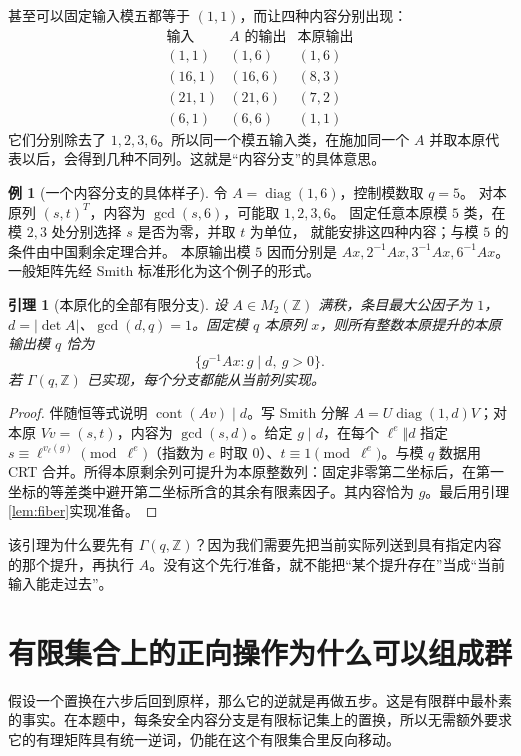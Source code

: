 \documentclass[11pt,a4paper,oneside,openany]{book}
\newcommand{\Z}{\mathbb Z}
\newcommand{\diag}{\operatorname{diag}}
\newcommand{\cont}{\operatorname{cont}}
\newtheorem{lemma}[theorem]{引理}
\theoremstyle{definition}
\newtheorem{example}[theorem]{例}
\numberwithin{equation}{chapter}
\begin{document}
甚至可以固定输入模五都等于 $(1,1)$，而让四种内容分别出现：
\[
\begin{array}{c|c|c}
\text{输入}&A\text{ 的输出}&\text{本原输出}\\ \hline
(1,1)&(1,6)&(1,6)\\
(16,1)&(16,6)&(8,3)\\
(21,1)&(21,6)&(7,2)\\
(6,1)&(6,6)&(1,1)
\end{array}
\]
它们分别除去了 $1,2,3,6$。所以同一个模五输入类，在施加同一个 $A$ 并取本原代表以后，会得到几种不同列。这就是“内容分支”的具体意思。
\begin{example}[一个内容分支的具体样子]
令 $A=\diag(1,6)$，控制模数取 $q=5$。
对本原列 $(s,t)^T$，内容为 $\gcd(s,6)$，可能取 $1,2,3,6$。
固定任意本原模 $5$ 类，在模 $2,3$ 处分别选择 $s$ 是否为零，并取 $t$ 为单位，
就能安排这四种内容；与模 $5$ 的条件由中国剩余定理合并。
本原输出模 $5$ 因而分别是 $Ax,2^{-1}Ax,3^{-1}Ax,6^{-1}Ax$。
一般矩阵先经 Smith 标准形化为这个例子的形式。
\end{example}
\begin{lemma}[本原化的全部有限分支]\label{lem:content}
设 $A\in M_2(\Z)$ 满秩，条目最大公因子为 $1$，$d=|\det A|$、$\gcd(d,q)=1$。固定模 $q$ 本原列 $x$，则所有整数本原提升的本原输出模 $q$ 恰为
\begin{equation}\label{eq:content}
\{g^{-1}Ax:g\mid d,\ g>0\}.
\end{equation}
若 $\Gamma(q,\Z)$ 已实现，每个分支都能从当前列实现。
\end{lemma}
\begin{proof}
伴随恒等式说明 $\cont(Av)\mid d$。写 Smith 分解 $A=U\diag(1,d)V$；对本原 $Vv=(s,t)$，内容为 $\gcd(s,d)$。给定 $g\mid d$，在每个 $\ell^e\Vert d$ 指定 $s\equiv\ell^{v_\ell(g)}\pmod{\ell^e}$（指数为 $e$ 时取 $0$）、$t\equiv1\pmod{\ell^e}$。与模 $q$ 数据用 CRT 合并。所得本原剩余列可提升为本原整数列：固定非零第二坐标后，在第一坐标的等差类中避开第二坐标所含的其余有限素因子。其内容恰为 $g$。最后用引理\ref{lem:fiber}实现准备。
\end{proof}
该引理为什么要先有 $\Gamma(q,\Z)$？因为我们需要先把当前实际列送到具有指定内容的那个提升，再执行 $A$。没有这个先行准备，就不能把“某个提升存在”当成“当前输入能走过去”。

\section{有限集合上的正向操作为什么可以组成群}
假设一个置换在六步后回到原样，那么它的逆就是再做五步。这是有限群中最朴素的事实。在本题中，每条安全内容分支是有限标记集上的置换，所以无需额外要求它的有理矩阵具有统一逆词，仍能在这个有限集合里反向移动。
\end{document}
